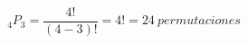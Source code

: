 \documentclass[preview]{standalone}
\begin{document}
\begin{center}
\[{}_4P_3 = \frac{4!}{(4-3)!} = 4! = 24 \ permutaciones\]
\end{center}
\end{document}

